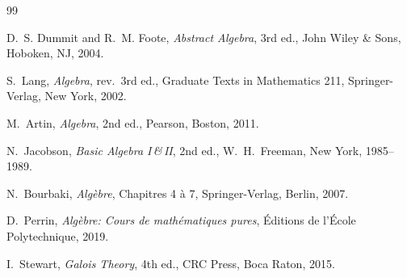 \documentclass[12pt,a4paper,openany]{book}
\theoremstyle{definition}
\theoremstyle{remark}
\begin{document}
\begin{thebibliography}{99}

D.~S. Dummit and R.~M. Foote,
\textit{Abstract Algebra}, 3rd ed.,
John Wiley \& Sons, Hoboken, NJ, 2004.

S.~Lang,
\textit{Algebra}, rev.\ 3rd ed.,
Graduate Texts in Mathematics 211, Springer-Verlag, New York, 2002.

M.~Artin,
\textit{Algebra}, 2nd ed.,
Pearson, Boston, 2011.

N.~Jacobson,
\textit{Basic Algebra I\,\&\,II}, 2nd ed.,
W.~H.~Freeman, New York, 1985--1989.

N.~Bourbaki,
\textit{Alg\`ebre}, Chapitres 4 \`a 7,
Springer-Verlag, Berlin, 2007.

D.~Perrin,
\textit{Alg\`ebre: Cours de math\'ematiques pures},
\'Editions de l'\'Ecole Polytechnique, 2019.

I.~Stewart,
\textit{Galois Theory}, 4th ed.,
CRC Press, Boca Raton, 2015.

\end{thebibliography}


\printindex
\end{document}
